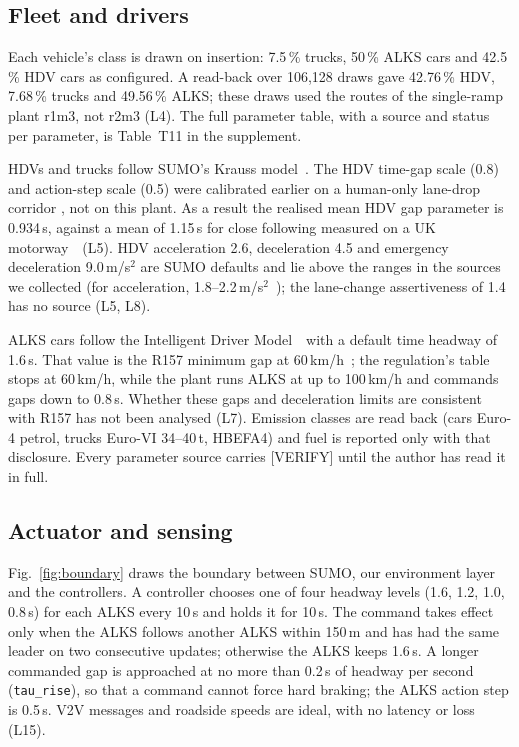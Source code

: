 \subsection{Fleet and drivers}\label{sec:fleet}

Each vehicle's class is drawn on insertion: 7.5\,\% trucks, 50\,\% ALKS cars and 42.5\,\% HDV cars as configured.
A read-back over 106,128 draws gave 42.76\,\% HDV, 7.68\,\% trucks and 49.56\,\% ALKS; these draws used the routes of the single-ramp plant r1m3, not r2m3 (L4).
The full parameter table, with a source and status per parameter, is Table~T11 in the supplement.

HDVs and trucks follow SUMO's Krauss model~\autocite{Krauss1998}\verify.
The HDV time-gap scale (0.8) and action-step scale (0.5) were calibrated earlier on a human-only lane-drop corridor , not on this plant.
As a result the realised mean HDV gap parameter is 0.934\,s, against a mean of 1.15\,s for close following measured on a UK motorway~\autocite{AlObaedi2019}\verify\ (L5).
HDV acceleration 2.6, deceleration 4.5 and emergency deceleration 9.0\,m/s$^2$ are SUMO defaults and lie above the ranges in the sources we collected (for acceleration, 1.8--2.2\,m/s$^2$~\autocite{Long2000}\verify); the lane-change assertiveness of 1.4 has no source (L5, L8).

ALKS cars follow the Intelligent Driver Model~\autocite{Treiber2000}\verify\ with a default time headway of 1.6\,s.
That value is the R157 minimum gap at 60\,km/h~\autocite{UNR157}\verify; the regulation's table stops at 60\,km/h, while the plant runs ALKS at up to 100\,km/h and commands gaps down to 0.8\,s.
Whether these gaps and deceleration limits are consistent with R157 has not been analysed (L7).
Emission classes are read back (cars Euro-4 petrol, trucks Euro-VI 34--40\,t, HBEFA4) and fuel is reported only with that disclosure.
Every parameter source carries [VERIFY] until the author has read it in full.

\subsection{Actuator and sensing}\label{sec:actuator}

Fig.~\ref{fig:boundary} draws the boundary between SUMO, our environment layer and the controllers.
A controller chooses one of four headway levels (1.6, 1.2, 1.0, 0.8\,s) for each ALKS every 10\,s and holds it for 10\,s.
The command takes effect only when the ALKS follows another ALKS within 150\,m and has had the same leader on two consecutive updates; otherwise the ALKS keeps 1.6\,s.
A longer commanded gap is approached at no more than 0.2\,s of headway per second (\texttt{tau\_rise}), so that a command cannot force hard braking; the ALKS action step is 0.5\,s.
V2V messages and roadside speeds are ideal, with no latency or loss (L15).

